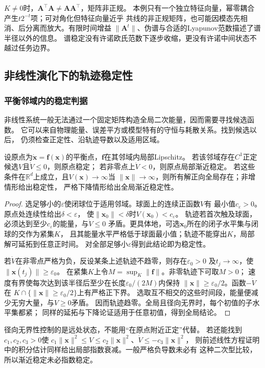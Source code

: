$K\neq0$时，$\bm A^\top\bm A\neq\bm A\bm A^\top$，矩阵非正规。
本例只有一个独立特征向量，幂零耦合产生$t2^{-t}$项；可对角化但特征向量近乎
共线的非正规矩阵，也可能因模态先相消、后分离而放大。有限时间增益
$\|\bm A^t\|$、伪谱与合适的Lyapunov范数描述了谱半径以外的信息。
谱稳定没有许诺欧氏范数下逐步收缩，更没有许诺中间状态不越过任务边界。

\subsection{非线性演化下的轨迹稳定性}

\subsubsection{平衡邻域内的稳定判据}

非线性系统一般无法通过一个固定矩阵构造全局二次能量，因而需要寻找候选函数。
它可以来自物理能量、误差平方或模型特有的守恒与耗散关系。找到候选以后，
仍须检查正定性、沿轨迹导数以及适用区域。
\begin{theorem}[连续时间Lyapunov判据]
  \label{thm:dynamical-nonlinear-lyapunov}
  设原点为$\dot{\bm x}=\bm f(\bm x)$的平衡点，$\bm f$在其邻域内局部Lipschitz。
  若该邻域存在$C^1$正定候选$V$且$\dot V\leq0$，则原点稳定；
  若非零点上$\dot V<0$，则原点局部渐近稳定。
  若这些条件在$\mathbb R^d$上成立，且$V(\bm x)\to\infty$当
  $\|\bm x\|\to\infty$，则所有解正向全局存在；非增情形给出稳定性，
  严格下降情形给出全局渐近稳定性。
\end{theorem}
\begin{proof}
  选足够小的$\varepsilon$使闭球位于适用邻域。球面上的连续正函数$V$有
  最小值$c_\varepsilon>0$。原点处连续性给出$\delta<\varepsilon$，
  使$\|\bm x_0\|<\delta$时$V(\bm x_0)<c_\varepsilon$。
  轨迹若首次触及球面，必须达到至少$c_\varepsilon$的能量，与$\dot V\leq0$
  矛盾。更具体地，可选$\bm x_0$所在的闭子水平集与闭球的交作为紧集$K$，
  且其能量水平严格低于球面最小值；轨迹不能穿出$K$，局部解可延拓到任意正时间。
  对全部足够小$\varepsilon$得到此结论即为稳定性。

  若$\dot V$在非零点严格为负，反设某条上述轨迹不趋零，则存在$\varepsilon_0>0$
  及$t_j\to\infty$，使$\|\bm x(t_j)\|\geq\varepsilon_0$。
  在紧集$K$上令$M=\sup_K\|\bm f\|$。非零轨迹下可取$M>0$；
  速度有界使每次达到该半径后至少在长度$\varepsilon_0/(2M)$内保持
  $\|\bm x\|\geq\varepsilon_0/2$。函数$-\dot V$在
  $K\cap\{\|\bm x\|\geq\varepsilon_0/2\}$上有严格正下界。
  选取互不相交的这些时间段，能量便减少无穷大量，与$V\geq0$矛盾。
  因而轨迹趋零。全局且径向无界时，每个初值的子水平集都紧；
  同样的延拓与下降论证适用于任意初值，得到全局结论。
\end{proof}
径向无界性控制的是远处状态，不能用“在原点附近正定”代替。
若还能找到$c_1,c_2,c_3>0$使
$c_1\|\bm x\|^2\leq V\leq c_2\|\bm x\|^2$、$\dot V\leq-c_3\|\bm x\|^2$，
则前述线性方程证明中的积分估计同样给出局部指数衰减。一般严格负导数未必有
这种二次型比较，所以渐近稳定未必指数稳定。

